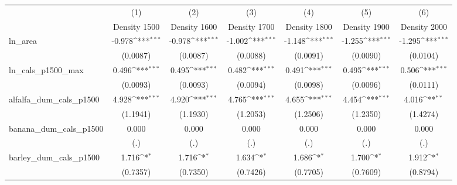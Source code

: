 {
\def\sym#1{\ifmmode^{#1}\else\(^{#1}\)\fi}
\begin{tabular}{l*{6}{c}}
\toprule
                    &\multicolumn{1}{c}{(1)}&\multicolumn{1}{c}{(2)}&\multicolumn{1}{c}{(3)}&\multicolumn{1}{c}{(4)}&\multicolumn{1}{c}{(5)}&\multicolumn{1}{c}{(6)}\\
                    &\multicolumn{1}{c}{Density 1500}&\multicolumn{1}{c}{Density 1600}&\multicolumn{1}{c}{Density 1700}&\multicolumn{1}{c}{Density 1800}&\multicolumn{1}{c}{Density 1900}&\multicolumn{1}{c}{Density 2000}\\
\midrule
ln\_area             &      -0.978\sym{***}&      -0.978\sym{***}&      -1.002\sym{***}&      -1.148\sym{***}&      -1.255\sym{***}&      -1.295\sym{***}\\
                    &    (0.0087)         &    (0.0087)         &    (0.0088)         &    (0.0091)         &    (0.0090)         &    (0.0104)         \\
\addlinespace
ln\_cals\_p1500\_max   &       0.496\sym{***}&       0.495\sym{***}&       0.482\sym{***}&       0.491\sym{***}&       0.495\sym{***}&       0.506\sym{***}\\
                    &    (0.0093)         &    (0.0093)         &    (0.0094)         &    (0.0098)         &    (0.0096)         &    (0.0111)         \\
\addlinespace
alfalfa\_dum\_cals\_p1500&       4.928\sym{***}&       4.920\sym{***}&       4.765\sym{***}&       4.655\sym{***}&       4.454\sym{***}&       4.016\sym{**} \\
                    &    (1.1941)         &    (1.1930)         &    (1.2053)         &    (1.2506)         &    (1.2350)         &    (1.4274)         \\
\addlinespace
banana\_dum\_cals\_p1500&       0.000         &       0.000         &       0.000         &       0.000         &       0.000         &       0.000         \\
                    &         (.)         &         (.)         &         (.)         &         (.)         &         (.)         &         (.)         \\
\addlinespace
barley\_dum\_cals\_p1500&       1.716\sym{*}  &       1.716\sym{*}  &       1.634\sym{*}  &       1.686\sym{*}  &       1.700\sym{*}  &       1.912\sym{*}  \\
                    &    (0.7357)         &    (0.7350)         &    (0.7426)         &    (0.7705)         &    (0.7609)         &    (0.8794)         \\

\end{tabular}}
